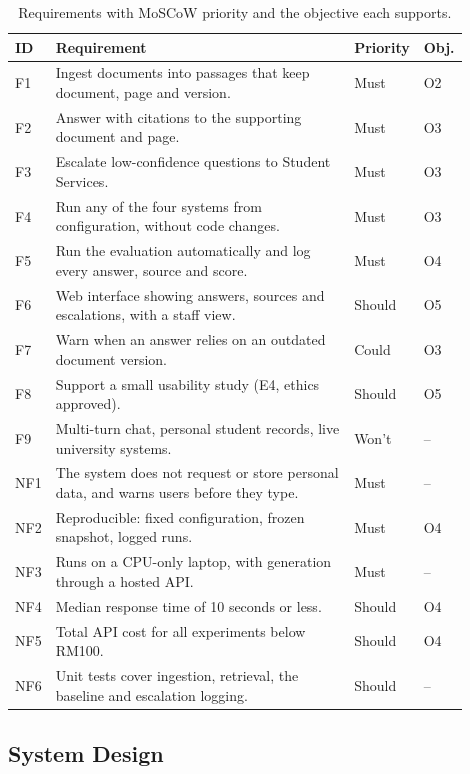 \documentclass[12pt,nonacm,acmlarge,titlepage,screen]{acmart}
\begin{document}
\begin{table}[H]
\caption{Requirements with MoSCoW priority and the objective each supports.}
\label{tab:req}
\footnotesize
\begin{tabular}{L{0.06\linewidth}L{0.68\linewidth}L{0.09\linewidth}L{0.07\linewidth}}
\toprule
ID & Requirement & Priority & Obj. \\
\midrule
F1 & Ingest documents into passages that keep document, page and version. & Must & O2 \\
F2 & Answer with citations to the supporting document and page. & Must & O3 \\
F3 & Escalate low-confidence questions to Student Services. & Must & O3 \\
F4 & Run any of the four systems from configuration, without code changes. & Must & O3 \\
F5 & Run the evaluation automatically and log every answer, source and score. & Must & O4 \\
F6 & Web interface showing answers, sources and escalations, with a staff view. & Should & O5 \\
F7 & Warn when an answer relies on an outdated document version. & Could & O3 \\
F8 & Support a small usability study (E4, ethics approved). & Should & O5 \\
F9 & Multi-turn chat, personal student records, live university systems. & Won't & -- \\
\midrule
NF1 & The system does not request or store personal data, and warns users before they type. & Must & -- \\
NF2 & Reproducible: fixed configuration, frozen snapshot, logged runs. & Must & O4 \\
NF3 & Runs on a CPU-only laptop, with generation through a hosted API. & Must & -- \\
NF4 & Median response time of 10 seconds or less. & Should & O4 \\
NF5 & Total API cost for all experiments below RM100. & Should & O4 \\
NF6 & Unit tests cover ingestion, retrieval, the baseline and escalation logging. & Should & -- \\
\bottomrule
\end{tabular}
\end{table}

\subsection{System Design} \label{sec:method_design}
\end{document}
